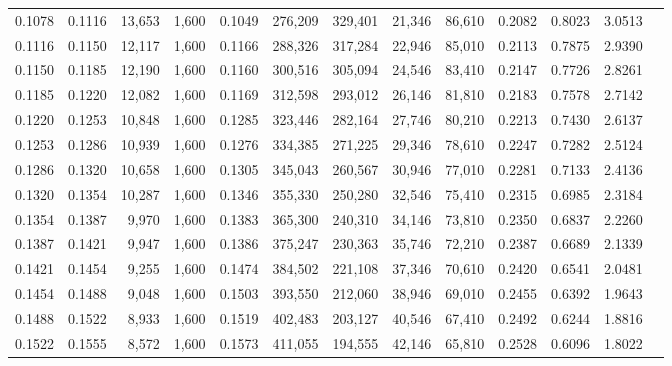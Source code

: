 \begin{tabular}{rrrrrrrrrrrrr}
0.1078 & 0.1116 & 13,653 & 1,600 &                                     0.1049 & 276,209 & 329,401 &  21,346 &  86,610 & 0.2082 & 0.8023 & 3.0513 \\
0.1116 & 0.1150 & 12,117 & 1,600 &                                     0.1166 & 288,326 & 317,284 &  22,946 &  85,010 & 0.2113 & 0.7875 & 2.9390 \\
0.1150 & 0.1185 & 12,190 & 1,600 &                                     0.1160 & 300,516 & 305,094 &  24,546 &  83,410 & 0.2147 & 0.7726 & 2.8261 \\
0.1185 & 0.1220 & 12,082 & 1,600 &                                     0.1169 & 312,598 & 293,012 &  26,146 &  81,810 & 0.2183 & 0.7578 & 2.7142 \\
0.1220 & 0.1253 & 10,848 & 1,600 &                                     0.1285 & 323,446 & 282,164 &  27,746 &  80,210 & 0.2213 & 0.7430 & 2.6137 \\
0.1253 & 0.1286 & 10,939 & 1,600 &                                     0.1276 & 334,385 & 271,225 &  29,346 &  78,610 & 0.2247 & 0.7282 & 2.5124 \\
0.1286 & 0.1320 & 10,658 & 1,600 &                                     0.1305 & 345,043 & 260,567 &  30,946 &  77,010 & 0.2281 & 0.7133 & 2.4136 \\
0.1320 & 0.1354 & 10,287 & 1,600 &                                     0.1346 & 355,330 & 250,280 &  32,546 &  75,410 & 0.2315 & 0.6985 & 2.3184 \\
0.1354 & 0.1387 &  9,970 & 1,600 &                                     0.1383 & 365,300 & 240,310 &  34,146 &  73,810 & 0.2350 & 0.6837 & 2.2260 \\
0.1387 & 0.1421 &  9,947 & 1,600 &                                     0.1386 & 375,247 & 230,363 &  35,746 &  72,210 & 0.2387 & 0.6689 & 2.1339 \\
0.1421 & 0.1454 &  9,255 & 1,600 &                                     0.1474 & 384,502 & 221,108 &  37,346 &  70,610 & 0.2420 & 0.6541 & 2.0481 \\
0.1454 & 0.1488 &  9,048 & 1,600 &                                     0.1503 & 393,550 & 212,060 &  38,946 &  69,010 & 0.2455 & 0.6392 & 1.9643 \\
0.1488 & 0.1522 &  8,933 & 1,600 &                                     0.1519 & 402,483 & 203,127 &  40,546 &  67,410 & 0.2492 & 0.6244 & 1.8816 \\
0.1522 & 0.1555 &  8,572 & 1,600 &                                     0.1573 & 411,055 & 194,555 &  42,146 &  65,810 & 0.2528 & 0.6096 & 1.8022 \\

\end{tabular}
